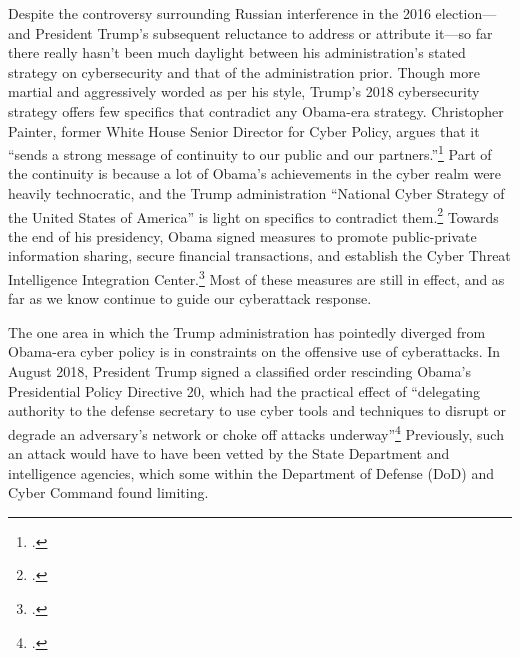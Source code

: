 \documentclass{memoir}
\begin{document}
\begin{refsegment}
Despite the controversy surrounding Russian interference in the 2016 election---and President Trump's subsequent reluctance to address or attribute it---so far there really hasn't been much daylight between his administration's stated strategy on cybersecurity and that of the administration prior. Though more martial and aggressively worded as per his style, Trump's 2018 cybersecurity strategy offers few specifics that contradict any Obama-era strategy. Christopher Painter, former White House Senior Director for Cyber Policy, argues that it ``sends a strong message of continuity to our public and our partners.''\footcite[Painter also served at the State Department for six years as the Coordinator for Cyber Issues, which at the time was an Assistant Secretary level position. Since then, its status within the department has fluctuated wildly. Rex Tillerson, Trump's first Secretary of State, announced that he would abolish the office and merge it into State's Bureau of Economic Affairs. Then, just a few months later, he proposed creating an entirely new department bureau with a Senate-confirmed Assistant Secretary, possibly in response to criticism of his first decision. Though current Secretary Mike Pompeo appears to have more interest in cyber policy, the State Department still has not reestablished a high level cyber position.]{painter_white_2018} Part of the continuity is because a lot of Obama's achievements in the cyber realm were heavily technocratic, and the Trump administration ``National Cyber Strategy of the United States of America'' is light on specifics to contradict them.\footcite{guest_blogger_white_2018} Towards the end of his presidency, Obama signed measures to promote public-private information sharing, secure financial transactions, and establish the Cyber Threat Intelligence Integration Center.\footcite[Among other actions taken during the Obama presidency, these were sufficenct for PolitiFact to update its 2013 rating of his cyber-enforcement actions to ``Promise Kept.'']{carroll_obama_2016} Most of these measures are still in effect, and as far as we know continue to guide our cyberattack response.

The one area in which the Trump administration has pointedly diverged from Obama-era cyber policy is in constraints on the offensive use of cyberattacks. In August 2018, President Trump signed a classified order rescinding Obama's Presidential Policy Directive 20, which had the practical effect of ``delegating authority to the defense secretary to use cyber tools and techniques to disrupt or degrade an adversary's network or choke off attacks underway''\footcite{nakashima_trump_2018} Previously, such an attack would have to have been vetted by the State Department and intelligence agencies, which some within the Department of Defense (DoD) and Cyber Command found limiting.


\end{refsegment}
\end{document}
